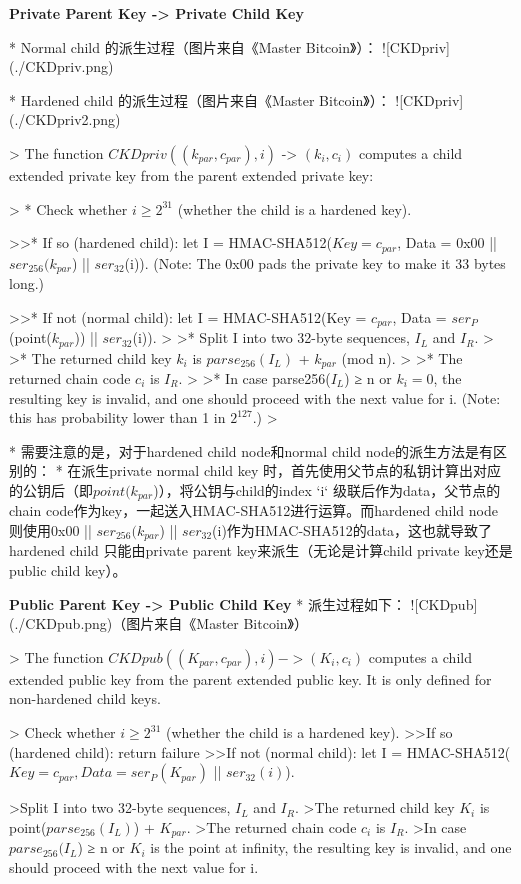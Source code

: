\documentclass{article}
\begin{document}
\textbf{Private Parent Key -> Private Child Key}
 
* Normal child 的派生过程（图片来自《Master Bitcoin》）：
![CKDpriv](./CKDpriv.png)

* Hardened child 的派生过程（图片来自《Master Bitcoin》）：
![CKDpriv](./CKDpriv2.png)

> The function $CKDpriv((k_{par}, c_{par}), i)$ -> $(k
_i, c_i)$ computes a child extended private key from the parent extended private key:

> * Check whether $i ≥ 2^{31}$ (whether the child is a hardened key).  

>>* If so (hardened child): let I = HMAC-SHA512($Key = c_{par}$, Data = 0x00 || $ser_{256}(k_{par}$) || $ser_{32}$(i)). (Note: The 0x00 pads the private key to make it 33 bytes long.)  

>>* If not (normal child): let I = HMAC-SHA512(Key = $c_{par}$, Data = $ser_P$(point($k_{par}$)) || $ser_{32}$(i)).  
>
>* Split I into two 32-byte sequences, $I_L$ and $I_R$.  
>
>* The returned child key $k_i$ is $parse_{256}(I_L)$ + $k_{par}$ (mod n).
>
>* The returned chain code $c_i$ is $I_R$.  
>
>* In case parse256($I_L$) ≥ n or $k_i = 0$, the resulting key is invalid, and one should proceed with the next value for i. (Note: this has probability lower than 1 in $2^{127}$.)  
>

* 需要注意的是，对于hardened child node和normal child node的派生方法是有区别的：
* 在派生private normal child key 时，首先使用父节点的私钥计算出对应的公钥后（即$point(k_{par}$)），将公钥与child的index `i` 级联后作为data，父节点的chain code作为key，一起送入HMAC-SHA512进行运算。而hardened child node 则使用0x00 || $ser_{256}(k_{par}$) || $ser_{32}$(i)作为HMAC-SHA512的data，这也就导致了hardened child 只能由private parent key来派生（无论是计算child private key还是public child key）。


\textbf{Public Parent Key -> Public Child Key}
* 派生过程如下：
![CKDpub](./CKDpub.png)（图片来自《Master Bitcoin》）

> The function $CKDpub((K_{par}, c_{par}), i) -> (K_i, c_i)$ computes a child extended public key from the parent extended public key. It is only defined for non-hardened child keys.

> Check whether $i ≥ 2^{31}$ (whether the child is a hardened key).
>>If so (hardened child): return failure  
>>If not (normal child): let I = HMAC-SHA512($Key = c_{par}, Data = ser_P(K_{par})$ || $ser_{32}(i)$).

>Split I into two 32-byte sequences, $I_L$ and $I_R$.  
>The returned child key $K_i$ is point($parse_{256}(I_L)$) + $K_{par}$.  
>The returned chain code $c_i$ is $I_R$.  
>In case $parse_{256}(I_L$) ≥ n or $K_i$ is the point at infinity, the resulting key is invalid, and one should proceed with the next value for i.
\end{document}
